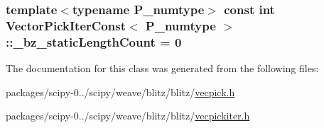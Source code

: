 \subsubsection[{\+\_\+bz\+\_\+static\+Length\+Count}]{\setlength{\rightskip}{0pt plus 5cm}template$<$typename P\+\_\+numtype$>$ const int {\bf Vector\+Pick\+Iter\+Const}$<$ P\+\_\+numtype $>$\+::\+\_\+bz\+\_\+static\+Length\+Count = 0\hspace{0.3cm}{\ttfamily [static]}}\label{classVectorPickIterConst_afa70ce044f98bf61e159595844293086}


The documentation for this class was generated from the following files\+:\begin{DoxyCompactItemize}
\item 
packages/scipy-\/0../scipy/weave/blitz/blitz/\hyperlink{vecpick_8h}{vecpick.\+h}\item 
packages/scipy-\/0../scipy/weave/blitz/blitz/\hyperlink{vecpickiter_8h}{vecpickiter.\+h}\end{DoxyCompactItemize}
